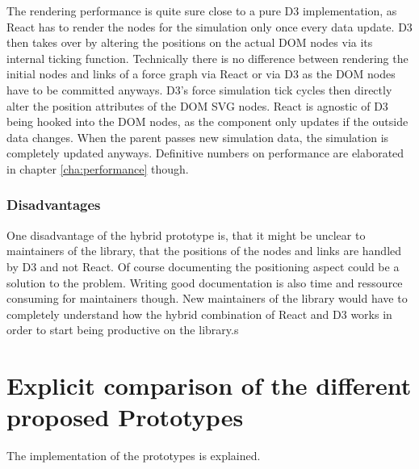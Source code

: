 The rendering performance is quite sure close to a pure D3 implementation, as React has to render the nodes for the simulation only once every data update. D3 then takes over by altering the positions on the actual DOM nodes via its internal ticking function. Technically there is no difference between rendering the initial nodes and links of a force graph via React or via D3 as the DOM nodes have to be committed anyways. D3's force simulation tick cycles then directly alter the position attributes of the DOM SVG nodes. React is agnostic of D3 being hooked into the DOM nodes, as the component only updates if the outside data changes. When the parent passes new simulation data, the simulation is completely updated anyways. Definitive numbers on performance are elaborated in chapter \ref{cha:performance} though.

\subsubsection{Disadvantages}

One disadvantage of the hybrid prototype is, that it might be unclear to maintainers of the library, that the positions of the nodes and links are handled by D3 and not React. Of course documenting the positioning aspect could be a solution to the problem. Writing good documentation is also time and ressource consuming for maintainers though. New maintainers of the library would have to completely understand how the hybrid combination of React and D3 works in order to start being productive on the library.s


\section{Explicit comparison of the different proposed Prototypes}

The implementation of the prototypes is explained.


